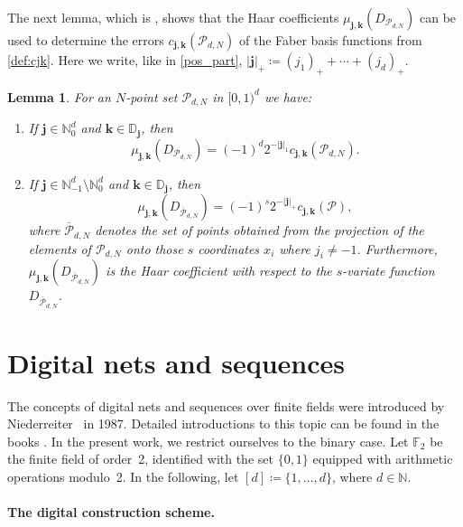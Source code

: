 \documentclass[12pt, a4paper]{article}
\newtheorem{lem}[thm]{Lemma}
\def\P{\mathcal{P}}
\newcommand{\bsj}{{\boldsymbol{j}}}
\newcommand{\bsk}{{\boldsymbol{k}}}
\newcommand{\calP}{{\mathcal{P}}}
\newcommand{\bbN}{{\mathbb{N}}}
\newcommand{\bbD}{{\mathbb{D}}}
\begin{document}
The next lemma, which is \cite[Lemma~5.2]{HMOU}, shows that the Haar coefficients $\mu_{\bsj, \bsk}(D_{\calP_{d, N}})$ can be used to determine the errors $c_{\bsj, \bsk}(\calP_{d, N})$ of the Faber basis functions from \eqref{def:cjk}. Here we write, like in \eqref{pos_part}, $|\bsj|_+\coloneqq(j_1)_++\cdots+(j_d)_+$.

\begin{lem}\label{le1}
For an $N$-point set $\calP_{d, N}$ in $[0,1)^d$ we have:
\begin{enumerate}
    \item[(i)] If $\bsj \in \bbN_0^d$ and $\bsk \in \bbD_{\bsj}$, then $$\mu_{\bsj,\bsk}(D_{\calP_{d, N}})=(-1)^d 2^{-|\bsj|_1}  c_{\bsj, \bsk}(\calP_{d, N}).$$ 
    \item[(ii)] If $\bsj \in \bbN_{-1}^d \setminus \bbN_0^d$ and $\bsk \in \bbD_{\bsj}$, then $$\mu_{\bsj,\bsk}(D_{\overline{\calP}_{d, N}})=(-1)^s 2^{-|\bsj|_+} c_{\bsj, \bsk}(\P),$$ where $\overline{\calP}_{d, N}$ denotes the set of points obtained from the projection of the elements of $\P_{d, N}$ onto those $s$ coordinates $x_i$ where $j_i\not=-1$. Furthermore, $\mu_{\bsj,\bsk}(D_{\overline{\P}_{d, N}})$ is the Haar coefficient with respect to the $s$-variate function $D_{\overline{\P}_{d, N}}$. 
\end{enumerate}
\end{lem}




\section{Digital nets and sequences}\label{sec:dignet}

The concepts of digital nets and sequences over finite fields were introduced by Nieder\-rei\-ter~\cite{N87} in 1987. Detailed introductions to this topic can be found in the books \cite{DP10,LP14,N92}. In the present work, we restrict ourselves to the binary case. Let $\mathbb{F}_2$ be the finite field of order~2, identified with the set $\{0,1\}$ equipped with arithmetic operations modulo~2. In the following, let $[d]\coloneqq\{1,\ldots,d\}$, where $d \in \mathbb{N}$.

\paragraph{The digital construction scheme.}
\end{document}
